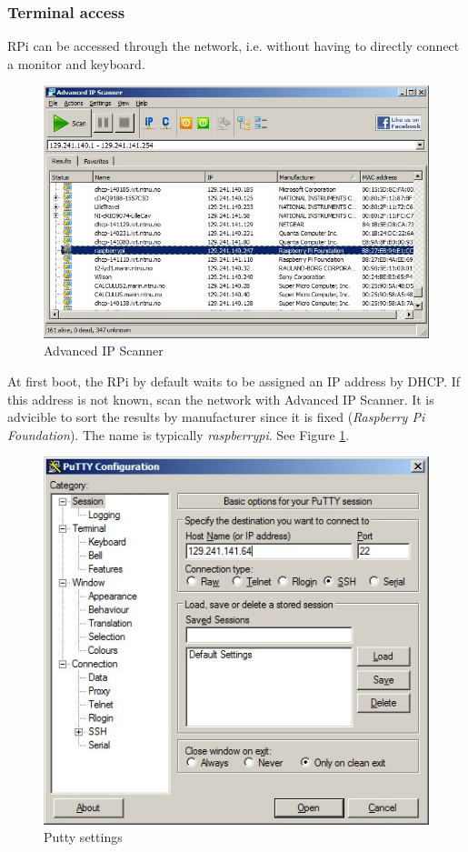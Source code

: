 \subsubsection{Terminal access}\label{subsec: Terminal access}
RPi can be accessed through the network, i.e. without having to directly connect a monitor and keyboard.
\begin{figure}[htb!]
	\centering \includegraphics[scale=0.45]{fig/advancedIPscanner} \caption{Advanced IP Scanner}
	\label{fig: Advanced IP Scanner} 
\end{figure} 
At first boot, the RPi by default waits to be assigned an IP address by DHCP. If this address is not known, scan the network with Advanced IP Scanner. It is advicible to sort the results by manufacturer since it is fixed (\textit{Raspberry Pi Foundation}). The name is typically \emph{raspberrypi}. See Figure \ref{fig: Advanced IP Scanner}.
\begin{figure}[htb!]
	\centering \includegraphics[scale=0.45]{fig/Rpi_remote_access1} \caption{Putty settings}
	\label{fig: Putty settings} 
\end{figure}
